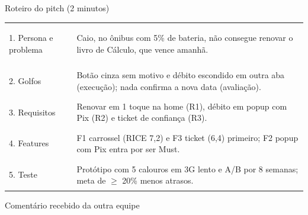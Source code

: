 \documentclass[10pt,a4paper]{article}
\begin{document}
\begin{caixa}{Roteiro do pitch (2 minutos)}
\renewcommand{\arraystretch}{1.35}%
\begin{tabularx}{\linewidth}{@{}>{\bfseries\raggedright\leavevmode\color{navy}\footnotesize}p{3.2cm}X@{}}
1. Persona e problema & Caio, no ônibus com 5\% de bateria, não consegue renovar o livro de Cálculo, que vence amanhã. \\
2. Golfos & Botão cinza sem motivo e débito escondido em outra aba (execução); nada confirma a nova data (avaliação). \\
3. Requisitos & Renovar em 1 toque na home (R1), débito em popup com Pix (R2) e ticket de confiança (R3). \\
4. Features & F1 carrossel (RICE 7,2) e F3 ticket (6,4) primeiro; F2 popup com Pix entra por ser Must. \\
5. Teste & Protótipo com 5 calouros em 3G lento e A/B por 8 semanas; meta de $\geq$ 20\% menos atrasos. \\
\end{tabularx}
\end{caixa}

\begin{caixa}{Comentário recebido da outra equipe}
\vspace{1.4cm}
\end{caixa}
\end{document}
